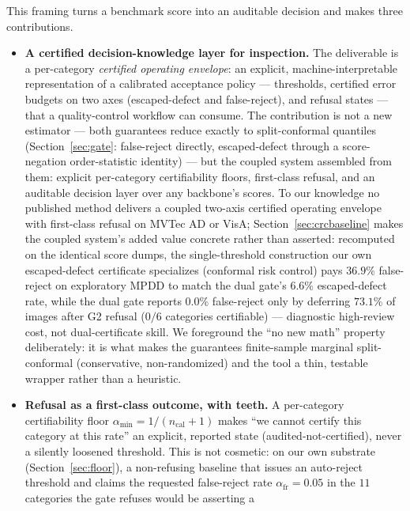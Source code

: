\documentclass[preprint,11pt]{elsarticle}
\begin{document}
This framing turns a benchmark score into an auditable decision and makes three contributions.

\begin{itemize}
  \item \textbf{A certified decision-knowledge layer for inspection.} The deliverable is a
        per-category \emph{certified operating envelope}: an explicit, machine-interpretable
        representation of a calibrated acceptance policy --- thresholds, certified
        error budgets on two axes (escaped-defect and false-reject), and refusal states ---
        that a quality-control workflow can consume. The contribution is not
        a new estimator --- both guarantees reduce exactly to split-conformal quantiles
        (Section~\ref{sec:gate}: false-reject directly, escaped-defect through a score-negation
        order-statistic identity) --- but the coupled system assembled from them: explicit
        per-category certifiability floors, first-class refusal, and an auditable decision layer
        over any backbone's scores. To our knowledge no published method delivers a coupled
        two-axis certified operating envelope with first-class refusal on MVTec AD or VisA;
        Section~\ref{sec:crcbaseline} makes the coupled system's added value concrete rather than
        asserted: recomputed on the identical score dumps, the single-threshold construction our
        own escaped-defect certificate specializes (conformal risk control) pays $36.9\%$
        false-reject on exploratory MPDD to match the dual gate's $6.6\%$ escaped-defect rate, while
        the dual gate reports $0.0\%$ false-reject only by deferring $73.1\%$ of images after G2
        refusal ($0/6$ categories certifiable) --- diagnostic high-review cost, not dual-certificate
        skill. We foreground the ``no new math'' property deliberately: it is what makes the
        guarantees finite-sample marginal split-conformal (conservative, non-randomized) and the tool a thin, testable wrapper rather than a heuristic.
  \item \textbf{Refusal as a first-class outcome, with teeth.} A per-category certifiability floor
        $\alpha_{\min}=1/(n_{\text{cal}}+1)$ makes ``we cannot certify this category at this rate''
        an explicit, reported state (audited-not-certified), never a silently loosened threshold.
        This is not cosmetic: on our own substrate (Section~\ref{sec:floor}), a non-refusing baseline
        that issues an auto-reject threshold and claims the requested false-reject rate
        $\alpha_{\text{fr}}=0.05$ in the $11$ categories the gate refuses would be asserting a

\end{itemize}
\end{document}

